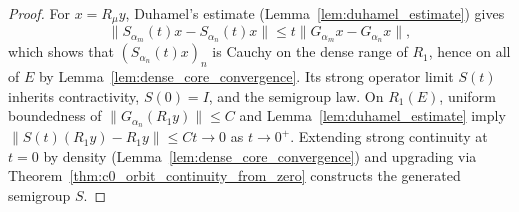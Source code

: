 \begin{proof}
\leanok
For $x = R_\mu y$, Duhamel's estimate (Lemma~\ref{lem:duhamel_estimate}) gives
\[
  \lVert S_{\alpha_m}(t)x - S_{\alpha_n}(t)x \rVert \le t \lVert G_{\alpha_m} x - G_{\alpha_n} x \rVert,
\]
which shows that $(S_{\alpha_n}(t)x)_n$ is Cauchy on the dense range of $R_1$, hence on all of $E$ by Lemma~\ref{lem:dense_core_convergence}. Its strong operator limit $S(t)$ inherits contractivity, $S(0) = I$, and the semigroup law. On $R_1(E)$, uniform boundedness of $\lVert G_{\alpha_n}(R_1 y) \rVert \le C$ and Lemma~\ref{lem:duhamel_estimate} imply $\lVert S(t)(R_1 y) - R_1 y \rVert \le C t \to 0$ as $t \to 0^+$. Extending strong continuity at $t = 0$ by density (Lemma~\ref{lem:dense_core_convergence}) and upgrading via Theorem~\ref{thm:c0_orbit_continuity_from_zero} constructs the generated semigroup $S$.
\end{proof}
